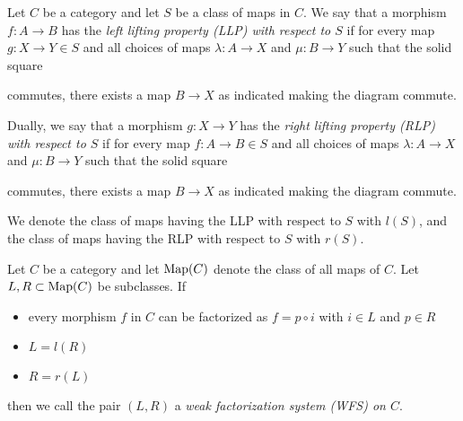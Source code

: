 \begin{definition}
    Let $C$ be a category and let $S$ be a class of maps in $C$.
    We say that a morphism $f\colon A\to B$ has the \emph{left lifting property (LLP) with respect to $S$} if for every map $g\colon X\to Y\in S$ and all choices of maps $\lambda\colon A\to X$ and $\mu\colon B\to Y$ such that the solid square
    \begin{center}
    \end{center}
    commutes, there exists a map $B\to X$ as indicated making the diagram commute.

    Dually, we say that a morphism $g\colon X\to Y$ has the \emph{right lifting property (RLP) with respect to $S$} if for every map $f\colon A\to B\in S$ and all choices of maps $\lambda\colon A\to X$ and $\mu\colon B\to Y$ such that the solid square
    \begin{center}
    \end{center}
    commutes, there exists a map $B\to X$ as indicated making the diagram commute.

    We denote the class of maps having the LLP with respect to $S$ with $l(S)$, and the class of maps having the RLP with respect to $S$ with $r(S)$.
\end{definition}
\begin{definition}
    Let $C$ be a category and let $\operatorname{Map}(C)$ denote the class of all maps of $C$.
    Let $L,R\subset\operatorname{Map}(C)$ be subclasses.
    If 
    \begin{itemize}
        \item every morphism $f$ in $C$ can be factorized as $f=p\circ i$ with $i\in L$ and $p\in R$
        \item $L=l(R)$
        \item $R=r(L)$
    \end{itemize}
    then we call the pair $(L,R)$ a \emph{weak factorization system (WFS) on $C$}.
\end{definition}
